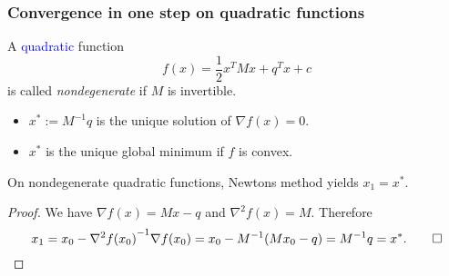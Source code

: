 \documentclass[aspectratio=149]{beamer}
\begin{document}
\begin{frame}
  \frametitle{Convergence in one step on quadratic functions}
  A \textcolor{blue}{quadratic} function
  \begin{equation}
    f(x) = \frac12 x^T M x + q^T x + c
  \end{equation}
  is called \textit{nondegenerate} if $M$ is invertible.
  \begin{itemize}
    \item $x^* := M^{-1}q$ is the unique solution of $\nabla f(x) = 0$.
    \item $x^*$ is the unique global minimum if $f$ is convex.
  \end{itemize}
  \begin{lemma}[\textcolor{gray}{arbitrary $x_0$}]%
    On nondegenerate quadratic functions, Newtons method yields $x_1=x^*$.
  \end{lemma}
  \begin{proof}
    We have $\nabla f(x) = Mx -q$ and $\nabla^2 f(x) = M$. Therefore
    \begin{equation}
      x_1 = x_0 - {\nabla^2 f(x_0)}^{-1} \nabla f(x_0) = x_0 - M^{-1}(M x_0 - q) = M^{-1}q = x^*. \qed\qedhere
    \end{equation}
  \end{proof}
\end{frame}


\end{document}

